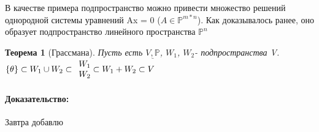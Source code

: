 \documentclass[l1pt]{article}
\newtheorem{theorem}{Теорема}
\newenvironment{proof}{\paragraph{Доказательство:}}{\hfill\newline}
\begin{document}
\begin{flushleft}
В качестве примера подпространство можно привести множество решений однородной системы уравнений Ax = 0 ($A \in \mathbb{P}^{m*n}$). Как доказывалось ранее, оно образует подпространство линейного пространства $\mathbb{P}^n$\newline

\begin{theorem}[Грассмана]
    Пусть есть $\underline{V, \mathbb{P}}$, $W_1$, $W_2$- подпространства V. 
    $\{\theta\}  \subset 
    W_1 \cup W_2 \subset 
    \begin{array}{c@{}c@{}c}
        W_1 \\
        W_2
    \end{array} \subset 
    W_1 + W_2 \subset 
    V
  $
\end{theorem}
\begin{proof}
    Завтра добавлю
\end{proof}
\end{flushleft}
\end{document}
